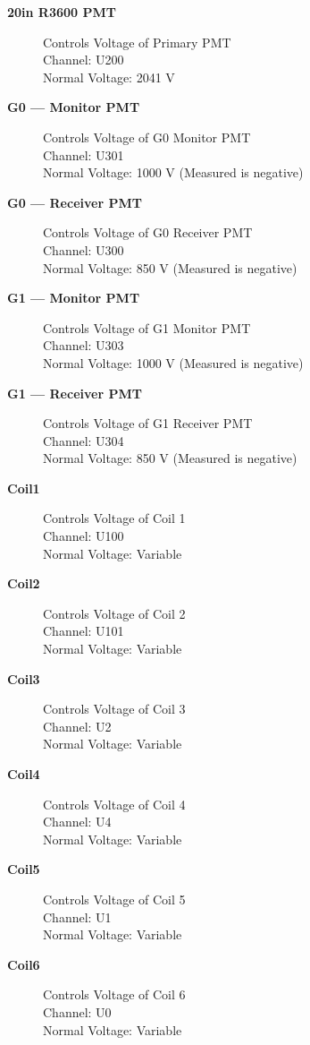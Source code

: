 \documentclass[twoside,letterpaper]{refart}
\begin{document}
\begin{description}
	
	\item[\textbf{20in R3600 PMT}] Controls Voltage of Primary PMT \\
	Channel: U200 \\
	Normal Voltage: 2041 V
	
	\item[\textbf{G0 --- Monitor PMT}] Controls Voltage of G0 Monitor PMT \\
	Channel: U301 \\
	Normal Voltage: 1000 V (Measured is negative)
	
	\item[\textbf{G0 --- Receiver PMT}] Controls Voltage of G0 Receiver PMT \\
	Channel: U300 \\
	Normal Voltage: 850 V (Measured is negative)
	
	\item[\textbf{G1 --- Monitor PMT}] Controls Voltage of G1 Monitor PMT \\
	Channel: U303 \\
	Normal Voltage: 1000 V (Measured is negative)
	
	\item[\textbf{G1 --- Receiver PMT}] Controls Voltage of G1 Receiver PMT \\
	Channel: U304 \\
	Normal Voltage: 850 V (Measured is negative)
		
	\item[\textbf{Coil1}] Controls Voltage of Coil 1 \\
	Channel: U100 \\
	Normal Voltage: Variable
	
	\item[\textbf{Coil2}] Controls Voltage of Coil 2 \\
	Channel: U101 \\
	Normal Voltage: Variable
	
	\item[\textbf{Coil3}] Controls Voltage of Coil 3 \\
	Channel: U2 \\
	Normal Voltage: Variable
	
	\item[\textbf{Coil4}] Controls Voltage of Coil 4 \\
	Channel: U4 \\
	Normal Voltage: Variable
	
	\item[\textbf{Coil5}] Controls Voltage of Coil 5 \\
	Channel: U1 \\
	Normal Voltage: Variable
	
	\item[\textbf{Coil6}] Controls Voltage of Coil 6 \\
	Channel: U0 \\
	Normal Voltage: Variable
	
\end{description}
\end{document}
